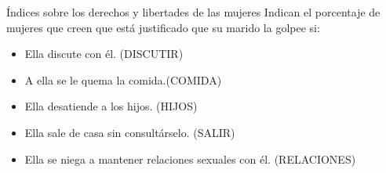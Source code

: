 \documentclass{beamer}
\begin{document}
\begin{frame}{Índices sobre los derechos y libertades de las mujeres}
Indican el porcentaje de mujeres que creen que está justificado que su marido la golpee si:
\begin{itemize}
    \item Ella discute con él. (DISCUTIR)
    \item A ella se le quema la comida.(COMIDA)
    \item Ella desatiende a los hijos. (HIJOS)
    \item Ella sale de casa sin consultárselo. (SALIR)
    \item Ella se niega a mantener relaciones sexuales con él. (RELACIONES)
\end{itemize}
\end{frame}
\end{document}
